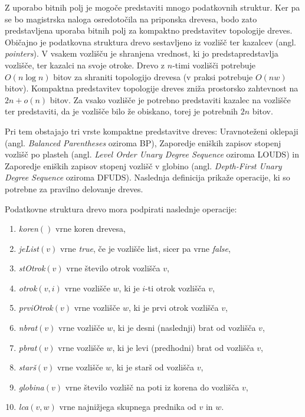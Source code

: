 Z uporabo bitnih polj je mogoče predstaviti mnogo podatkovnih struktur. Ker pa se bo magistrska naloga osredotočila na priponska drevesa, bodo zato predstavljena uporaba bitnih polj za kompaktno predstavitev topologije dreves. Običajno je podatkovna struktura drevo sestavljeno iz vozlišč ter kazalcev (angl. \textit{pointers}). V vsakem vozlišču je shranjena vrednost, ki jo predstapredstavlja vozlišče, ter kazalci na svoje otroke. Drevo z $n$-timi vozlišči potrebuje $O(n\log{n})$ bitov za shraniti topologijo drevesa (v praksi potrebuje $O(nw)$ bitov). Kompaktna predstavitev topologije dreves zniža prostorsko zahtevnost na $2n+o(n)$ bitov. Za vsako vozlišče je potrebno predstaviti kazalec na vozlišče ter predstaviti, da je vozlišče bilo že obiskano, torej je potrebnih $2n$ bitov.

Pri tem obstajajo tri vrste kompaktne predstavitve dreves: Uravnoteženi oklepaji (angl. \textit{Balanced Parentheses} oziroma BP), Zaporedje eniških zapisov stopenj vozlišč po plasteh (angl. \textit{Level Order Unary Degree Sequence} oziroma LOUDS) in Zaporedje eniških zapisov stopenj vozlišč v globino (angl. \textit{Depth-First Unary Degree Sequence} oziroma DFUDS).
Naslednja definicija prikaže operacije, ki so potrebne za pravilno delovanje dreves.


\begin{defi}\label{def:drevo}
    Podatkovne struktura drevo mora podpirati naslednje operacije:
    \begin{enumerate}
        \item \textit{koren}$()$ vrne koren drevesa,
        \item \textit{jeList}$(v)$ vrne \textit{true}, če je vozlišče list, sicer pa vrne \textit{false},
        \item \textit{stOtrok}$(v)$ vrne število otrok vozlišča $v$,
        \item \textit{otrok}$(v,i)$ vrne vozlišče $w$, ki je $i$-ti otrok vozlišča $v$,
        \item \textit{prviOtrok}$(v)$ vrne vozlišče $w$, ki je prvi otrok vozlišča $v$,
        \item \textit{nbrat}$(v)$ vrne vozlišče $w$, ki je desni (naslednji) brat od vozlišča $v$,
        \item \textit{pbrat}$(v)$ vrne vozlišče $w$, ki je levi (predhodni) brat od vozlišča $v$,
        \item \textit{starš}$(v)$ vrne vozlišče $w$, ki je starš od vozlišča $v$,
        \item \textit{globina}$(v)$ vrne število vozlišč na poti iz korena do vozlišča $v$, %
        \item \textit{lca}$(v,w)$ vrne najnižjega skupnega prednika od $v$ in $w$.
    \end{enumerate}
\end{defi}


